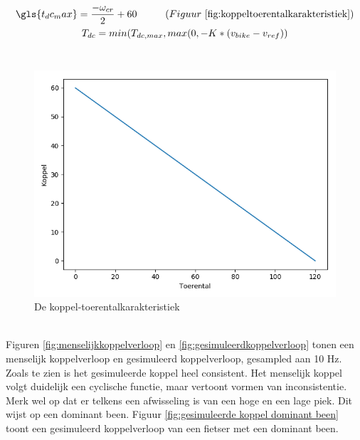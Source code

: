 \begin{gather*}
\gls{t_dc_max} = \frac{-\omega_{cr}}{2}+60 \tab (Figuur\ \ref{fig:koppeltoerentalkarakteristiek}) \\
T_{dc} = min(T_{dc,max},max(0,-K*(v_{bike}-v_{ref}))
\end{gather*}
\\
\begin{figure}
  \includegraphics[width=\linewidth]{images/koppel-toerentalkarakteristiek.png}
  \caption{De koppel-toerentalkarakteristiek}
  \label{fig:koppeltoerentalkarakteristiek}
\end{figure}
\\
\noindent Figuren \ref{fig:menselijkkoppelverloop} en \ref{fig:gesimuleerdkoppelverloop} tonen een menselijk koppelverloop en gesimuleerd koppelverloop, gesampled aan 10 Hz. Zoals te zien is het gesimuleerde koppel heel consistent. Het menselijk koppel volgt duidelijk een cyclische functie, maar vertoont vormen van inconsistentie. Merk wel op dat er telkens een afwisseling is van een hoge en een lage piek. Dit wijst op een dominant been. Figuur \ref{fig:gesimuleerde koppel dominant been} toont een gesimuleerd koppelverloop van een fietser met een dominant been.
\\\\
